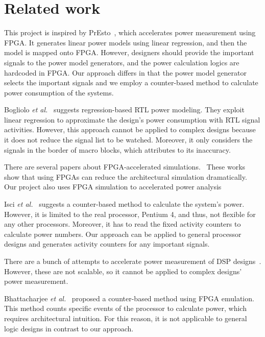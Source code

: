 \section{Related work}
\label{sec:related_work}

This project is inspired by PrEsto~\cite{PrEsto}, which accelerates power measurement using FPGA. 
It generates linear power models using linear regression, and then the model is mapped onto FPGA. 
However, designers should provide the important signals to the power model generators, and the power calculation logics are hardcoded in FPGA. 
Our approach differs in that the power model generator selects the important signals and we employ a counter-based method to calculate power consumption of the systems.

Bogliolo \textit{et al.}~\cite{Bogliolo2000} suggests regression-based RTL power modeling. 
They exploit linear regression to approximate the design's power consumption with RTL signal activities.
However, this approach cannot be applied to complex designs because it does not reduce the signal list to be watched.
Moreover, it only considers the signals in the border of macro blocks, which attributes to its inaccuracy.

There are several papers about FPGA-accelerated simulations.~\cite{Protoflex,Fast,RAMPGold,FAME,HAsim}
These works show that using FPGAs can reduce the architectural simulation dramatically.
Our project also uses FPGA simulation to accelerated power analysis

Isci \textit{et al.}~\cite{Isci2003} suggests a counter-based method to calculate the system’s power. 
However, it is limited to the real processor, Pentium 4, and thus, not flexible for any other processors. 
Moreover, it has to read the fixed activity counters to calculate power numbers. 
Our approach can be applied to general processor designs and generates activity counters for any important signals.

There are a bunch of attempts to accelerate power measurement of DSP designs~\cite{Coburn2005,Atienza2006,Ghodrat2007}.
However, these are not scalable, so it cannot be applied to complex designs' power measurement.

Bhattacharjee \textit{et al.}~\cite{Bhattacharjee2008} proposed a counter-based method using FPGA emulation. 
This method counts specific events of the processor to calculate power, which requires architectural intuition. 
For this reason, it is not applicable to general logic designs in contrast to our approach.